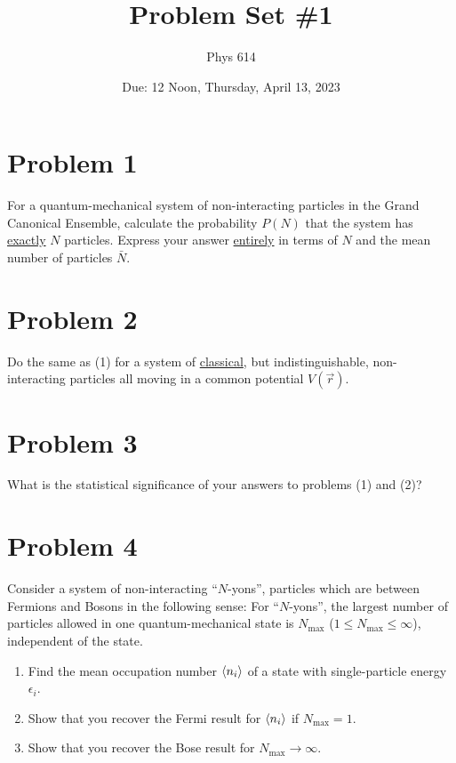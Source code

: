 \documentclass[12pt]{article}
\begin{document}
\title{Problem Set \#1}
\author{Phys 614}
\date{Due: 12 Noon, Thursday, April 13, 2023}
\maketitle

\section*{Problem 1}
For a quantum-mechanical system of non-interacting particles in the Grand Canonical Ensemble, calculate the probability $P(N)$ that the system has \underline{exactly} $N$ particles. Express your answer \underline{entirely} in terms of $N$ and the mean number of particles $\bar{N}$.

\section*{Problem 2}
Do the same as (1) for a system of \underline{classical}, but indistinguishable, non-interacting particles all moving in a common potential $V(\vec{r})$.

\section*{Problem 3}
What is the statistical significance of your answers to problems (1) and (2)?

\section*{Problem 4}
Consider a system of non-interacting ``$N$-yons'', particles which are between Fermions and Bosons in the following sense: For ``$N$-yons'', the largest number of particles allowed in one quantum-mechanical state is $N_{\text{max}}$ ($1 \leq N_{\text{max}} \leq \infty$), independent of the state.
\begin{enumerate}[label=(\alph*)]
    \item Find the mean occupation number $\ev{n_i}$ of a state with single-particle energy $\epsilon_i$.
    \item Show that you recover the Fermi result for $\ev{n_i}$ if $N_{\text{max}}=1$.
    \item Show that you recover the Bose result for $N_{\text{max}}\to\infty$.
\end{enumerate}
\end{document}

